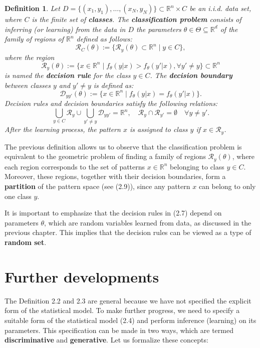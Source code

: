 \documentclass{report}
\newtheorem{definition}{Definition}[chapter]
\begin{document}
\begin{definition}
Let $D = \{(x_1,y_1),\dots,(x_N,y_N)\} \subset \mathbb{R}^n \times C$ be an i.i.d. data set, where $C$ is the finite set of \textbf{classes}. The \textbf{classification problem} consists of inferring (or learning) from the data in $D$ the parameters $\theta \in \Theta \subseteq \mathbb{R}^d$ of the family of regions of $\mathbb{R}^n$ defined as follows:
\begin{equation}
\mathcal{R}_C(\theta) := \{\mathcal{R}_y(\theta) \subset \mathbb{R}^n \mid y \in C\},
\end{equation}
where the region
\begin{equation}
\mathcal{R}_y(\theta) := \{x \in \mathbb{R}^n \mid f_\theta(y|x) > f_\theta(y'|x), \forall y' \neq y\} \subset \mathbb{R}^n
\end{equation}
is named the \textbf{decision rule} for the class $y \in C$. The \textbf{decision boundary} between classes $y$ and $y' \neq y$ is defined as:
\begin{equation}
\mathcal{D}_{yy'}(\theta) := \{x \in \mathbb{R}^n \mid f_\theta(y|x) = f_\theta(y'|x)\}.
\end{equation}
Decision rules and decision boundaries satisfy the following relations:
\begin{equation}
\bigcup_{y \in C} \mathcal{R}_y \cup \bigcup_{y' \neq y} \mathcal{D}_{yy'} = \mathbb{R}^n, \quad \mathcal{R}_y \cap \mathcal{R}_{y'} = \emptyset \quad \forall y \neq y'.
\end{equation}
After the learning process, the pattern $x$ is assigned to class $y$ if $x \in \mathcal{R}_y$.
\end{definition}

The previous definition allows us to observe that the classification problem is equivalent to the geometric problem of finding a family of regions $\mathcal{R}_y(\theta)$, where each region corresponds to the set of patterns $x \in \mathbb{R}^n$ belonging to class $y \in C$. Moreover, these regions, together with their decision boundaries, form a \textbf{partition} of the pattern space (see (2.9)), since any pattern $x$ can belong to only one class $y$.

It is important to emphasize that the decision rules in (2.7) depend on parameters $\theta$, which are random variables learned from data, as discussed in the previous chapter. This implies that the decision rules can be viewed as a type of \textbf{random set}.

\section{Further developments}
The Definition 2.2 and 2.3 are general because we have not specified the explicit form of the statistical model. To make further progress, we need to specify a suitable form of the statistical model (2.4) and perform inference (learning) on its parameters. This specification can be made in two ways, which are termed \textbf{discriminative} and \textbf{generative}. Let us formalize these concepts:
\end{document}
